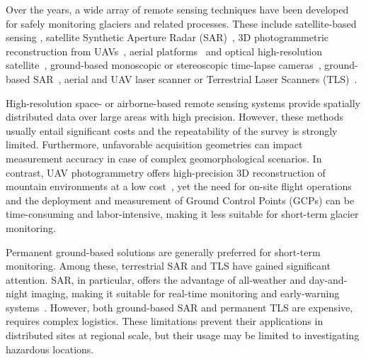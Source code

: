 Over the years, a wide array of remote sensing techniques have been developed for safely monitoring glaciers and related processes.
These include satellite-based sensing \citep{altena_kaab_2020,Scherler2008},
satellite Synthetic Aperture Radar (SAR)~\citep{Strozzi2020}, 
3D photogrammetric reconstruction from UAVs~\citep{Chudley2019,Ioli2022},
aerial platforms~\citep{Degaetani2021} and optical high-resolution satellite~\citep{Tonolo2020},
ground-based monoscopic or stereoscopic time-lapse cameras~\citep{Messerli2015,Schwalbe2017,Hendrickx2022},
ground-based SAR~\citep{Dematteis2018,Noferini2009}, 
aerial and UAV laser scanner \citep{Hartl2023} 
or Terrestrial Laser Scanners (TLS)~\citep{Hendrickx2022,Voordendag2023}.

High-resolution space- or airborne-based remote sensing systems provide spatially distributed data over large areas with high precision.
However, these methods usually entail significant costs and the repeatability of the survey is strongly limited.
Furthermore, unfavorable acquisition geometries can impact measurement accuracy in case of complex geomorphological scenarios. 
In contrast, UAV photogrammetry offers high-precision 3D reconstruction of mountain environments at a low cost~\citep{Chudley2019,Ioli2022},
yet the need for on-site flight operations and the deployment and measurement of Ground Control Points (GCPs) can be time-consuming and labor-intensive, making it less suitable for short-term glacier monitoring.

Permanent ground-based solutions are generally preferred for short-term monitoring.
Among these, terrestrial SAR and TLS have gained significant attention.
SAR, in particular, offers the advantage of all-weather and day-and-night imaging, making it suitable for
real-time monitoring and early-warning systems~\citep{Dematteis2021,Noferini2009}.
However, both ground-based SAR and permanent TLS are expensive, requires complex
logistics.
These limitations prevent their applications in distributed sites at regional scale, but
their usage may be limited to investigating hazardous locations.

